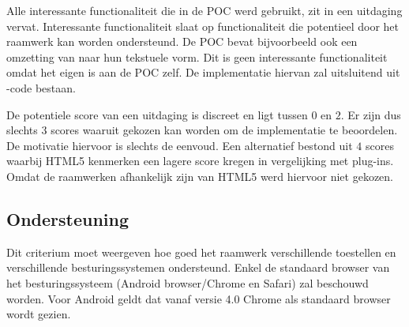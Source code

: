 Alle interessante functionaliteit die in de POC werd gebruikt, zit in een uitdaging vervat.  
Interessante functionaliteit slaat op functionaliteit die potentieel door het raamwerk kan worden ondersteund.
De POC bevat bijvoorbeeld ook een omzetting van  naar hun tekstuele vorm.
Dit is geen interessante functionaliteit omdat het eigen is aan de POC zelf.
De implementatie hiervan zal uitsluitend uit  \js{}-code bestaan.

De potentiele score van een uitdaging is discreet en ligt tussen $0$ en $2$.
Er zijn dus slechts $3$ scores waaruit gekozen kan worden om de implementatie te beoordelen.
De motivatie hiervoor is slechts de eenvoud.
Een alternatief bestond uit $4$ scores waarbij HTML5 kenmerken een lagere score kregen in vergelijking met plug-ins.
Omdat de raamwerken afhankelijk zijn van HTML5 werd hiervoor niet gekozen.


\subsection{Ondersteuning}
\label{sec:vergelijking-ondersteuning}
Dit criterium moet weergeven hoe goed het raamwerk verschillende toestellen en verschillende besturingssystemen ondersteund.
Enkel de standaard browser van het besturingssysteem (Android browser/Chrome en Safari) zal beschouwd worden.
Voor Android geldt dat vanaf versie 4.0 Chrome als standaard browser wordt gezien. %


